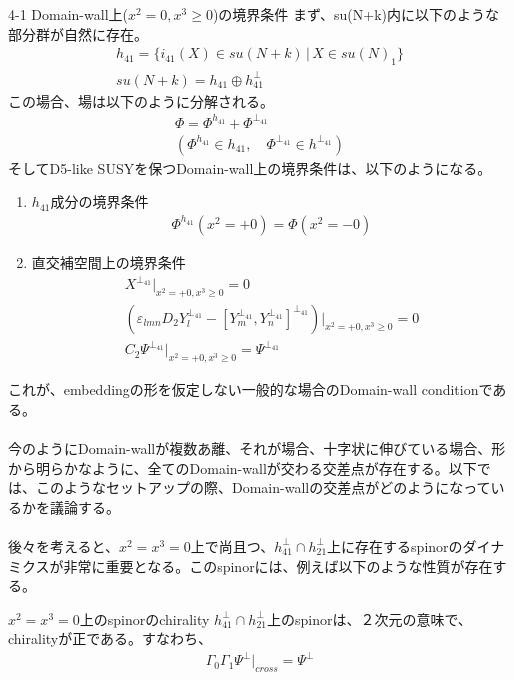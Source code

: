 \documentclass[dvipdfmx,a4paper,10.5pt]{article}
\numberwithin{equation}{section}
\begin{document}
\begin{resultbox}{4-1 Domain-wall上($x^{2}=0,x^{3}\geq0$)の境界条件}
    まず、su(N+k)内に以下のような部分群が自然に存在。
    \begin{gather*}
        h_{41}=\{i_{41}(X)\in su(N+k)\,|\,X\in su(N)_{1}\}\\
        su(N+k)=h_{41}\oplus h_{41}^{\perp}
    \end{gather*}
    この場合、場は以下のように分解される。
    \begin{gather*}
        \Phi=\Phi^{h_{41}}+\Phi^{\perp_{41}}\\
        (\Phi^{h_{41}}\in h_{41},\quad \Phi^{\perp_{41}}\in h^{\perp_{41}})
    \end{gather*}
    そしてD5-like SUSYを保つDomain-wall上の境界条件は、以下のようになる。
    \begin{enumerate}
        \item $h_{41}$成分の境界条件
        \begin{align*}
            \Phi^{h_{41}}(x^{2}=+0)=\Phi(x^{2}=-0)
        \end{align*}
        \item 直交補空間上の境界条件
        \begin{gather*}
            X^{\perp_{41}}|_{x^{2}=+0,x^{3}\geq 0}=0\\
            (\varepsilon_{lmn}D_{2}Y_{l}^{\perp_{41}}-[Y_{m}^{\perp_{41}},Y_{n}^{\perp_{41}}]^{\perp_{41}})|_{x^{2}=+0,x^{3}\geq 0}=0\\
            C_{2}\Psi^{\perp_{41}}|_{x^{2}=+0,x^{3}\geq 0}=\Psi^{\perp_{41}}
        \end{gather*}
    \end{enumerate}    
\end{resultbox}
これが、embeddingの形を仮定しない一般的な場合のDomain-wall conditionである。\\
\\
今のようにDomain-wallが複数あ離、それが場合、十字状に伸びている場合、形から明らかなように、全てのDomain-wallが交わる交差点が存在する。以下では、このようなセットアップの際、Domain-wallの交差点がどのようになっているかを議論する。\\
\\
後々を考えると、$x^{2}=x^{3}=0$上で尚且つ、$h_{41}^{\perp}\cap h^{\perp}_{21}$上に存在するspinorのダイナミクスが非常に重要となる。このspinorには、例えば以下のような性質が存在する。
\begin{resultbox}{$x^{2}=x^{3}=0$上のspinorのchirality}
$h_{41}^{\perp}\cap h^{\perp}_{21}$上のspinorは、２次元の意味で、chiralityが正である。すなわち、
    \begin{align*}
        \Gamma_{0}\Gamma_{1}\Psi^{\perp}|_{cross}=\Psi^{\perp}
    \end{align*}
\end{resultbox}
\end{document}
